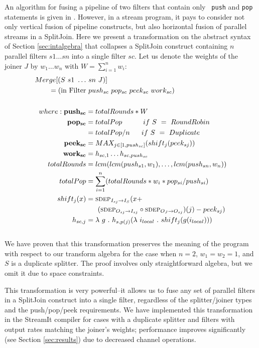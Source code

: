 An algorithm for fusing a pipeline of two filters that contain only {\tt
push} and {\tt pop} statements is given in \cite{pro96}.  However, in a
stream program, it pays to consider not only vertical fusion of pipeline
constructs, but also horizontal fusion of parallel streams in a
SplitJoin.  Here we present a transformation on the abstract syntax of
Section \ref{sec:intalgebra} that collapses a SplitJoin construct
containing $n$ parallel filters $s1 \dots sn$ into a single filter $sc$.
Let us denote the weights of the joiner $J$ by $w_1 \dots w_n$ with $W =
\sum_{i=1}^{n}{w_i}$: \\ \vspace{-6pt}
\begin{align*}
Merge[(S~s1~\dots&~sn~J)] \\ = (\mbox{in~Filter}&~push_{sc}~pop_{sc}~peek_{sc}~work_{sc}) \\ \vspace{-12pt} \\ 
where: {\bf push_{sc}} &= totalRounds * W \\
       {\bf pop_{sc}} &= totalPop ~~~~~~~~~if~S~=~RoundRobin \\
                &= totalPop / n ~~~~~if~S~=~Duplicate \\
       {\bf peek_{sc}} &= MAX_{j \in [1,push_{sc}]}(shift_j(peek_{sj})) \\
       {\bf work_{sc}} &= h_{sc, 1} \dots h_{sc, push_{sc}} \\
       totalRounds &= lcm(lcm(push_{s1}, w_1), \dots, lcm(push_{sn},
       w_n)) \\
       totalPop &= \sum_{i=1}^{n}(totalRounds * w_i * pop_{si} / push_{si}) \\
       shift_j(x) &= \mi{I_S}{I_{sj}}(x + \\ &~~~~~(\mi{I_{sj}}{O_{sj}} \circ \mi{O_{sj}}{O_J})(j)-peek_{sj}) \\
       h_{sc, j} &= \la~g~.~h_{s,p(j)}(\la~i_{local}~.~shift_j(g(i_{local})))
\end{align*} \vspace{-6pt} \\ 
We have proven that this transformation preserves the meaning of the
program with respect to our transform algebra for the case when $n = 2$,
$w_1 = w_2 = 1$, and $S$ is a duplicate splitter.  The proof involves
only straightforward algebra, but we omit it due to space constraints.

This transformation is very powerful--it allows us to fuse any set of
parallel filters in a SplitJoin construct into a single filter,
regardless of the splitter/joiner types and the push/pop/peek
requirements.  We have implemented this transformation in the StreamIt
compiler for cases with a duplicate splitter and filters with output
rates matching the joiner's weights; performance improves significantly
(see Section \ref{sec:results}) due to decreased channel operations.

